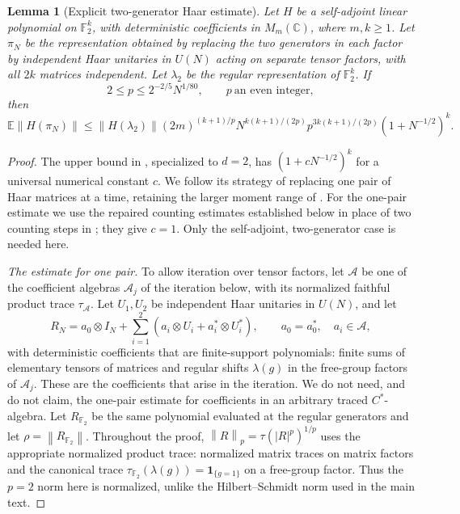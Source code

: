 \documentclass[11pt]{article}
\numberwithin{equation}{section}
\newtheorem{lemma}[theorem]{Lemma}
\theoremstyle{boldremark}\newtheorem{remark}[theorem]{Remark}
\newcommand{\C}{\mathbb C}
\newcommand{\F}{\mathbb F}
\newcommand{\E}{\mathbb E}
\newcommand{\M}{M}
\newcommand{\norm}[1]{\left\lVert #1\right\rVert}
\begin{document}
\begin{lemma}[Explicit two-generator Haar estimate]
\label{lem:haar}
Let $H$ be a self-adjoint linear polynomial on $\F_2^k$, with
deterministic coefficients in $\M_m(\C)$, where $m,k\ge1$.
Let $\pi_N$ be the representation obtained by replacing the two
generators in each factor by independent Haar unitaries in $U(N)$
acting on separate tensor factors, with all $2k$ matrices independent.
Let $\lambda_2$ be the regular representation of $\F_2^k$. If
\begin{equation}
 2\le p\le2^{-2/5}N^{1/80},\qquad
 p\ \text{an even integer},
 \label{eq:haar-hypotheses}
\end{equation}
then
\[
 \E\norm{H(\pi_N)}\le\norm{H(\lambda_2)}
 (2m)^{(k+1)/p}N^{k(k+1)/(2p)}
 p^{3k(k+1)/(2p)}(1+N^{-1/2})^k.
\]
\end{lemma}
\begin{proof}
The upper bound in \cite[Lemma~9.3]{BC}, specialized to $d=2$,
has $(1+cN^{-1/2})^k$ for a universal numerical constant $c$.
We follow its strategy of replacing one pair of Haar matrices at a
time, retaining the larger moment range of \cite[Theorem~5.1]{BC}.
For the one-pair estimate we use the repaired counting estimates
established below in place of two counting steps in
\cite[Section~5.2]{BC}; they give $c=1$.
Only the self-adjoint, two-generator case is needed here.

\emph{The estimate for one pair.}
To allow iteration over tensor factors, let $\mathcal A$ be one of
the coefficient algebras $\mathcal A_j$ of the iteration below, with
its normalized faithful product trace $\tau_{\mathcal A}$.
Let $U_1,U_2$ be independent Haar unitaries in $U(N)$, and let
\[
 R_N=a_0\otimes I_N+
       \sum_{i=1}^2(a_i\otimes U_i+a_i^*\otimes U_i^*),
 \qquad a_0=a_0^*,\quad a_i\in\mathcal A,
\]
with deterministic coefficients that are finite-support polynomials:
finite sums of elementary tensors of matrices and regular shifts
$\lambda(g)$ in the free-group factors of $\mathcal A_j$.
These are the coefficients that arise in the iteration. We do not
need, and do not claim, the one-pair estimate for coefficients in an
arbitrary traced $C^*$-algebra. Let $R_{\F_2}$ be the same
polynomial evaluated at the regular generators and let
$\rho=\norm{R_{\F_2}}$.
Throughout the proof, $\norm R_p=\tau(|R|^p)^{1/p}$ uses the
appropriate normalized product trace: normalized matrix traces
on matrix factors and the canonical trace
$\tau_{\F_2}(\lambda(g))=\mathbf1_{\{g=1\}}$ on a free-group factor.
Thus the $p=2$ norm here is normalized, unlike the Hilbert--Schmidt
norm used in the main text.


\end{proof}
\end{document}
